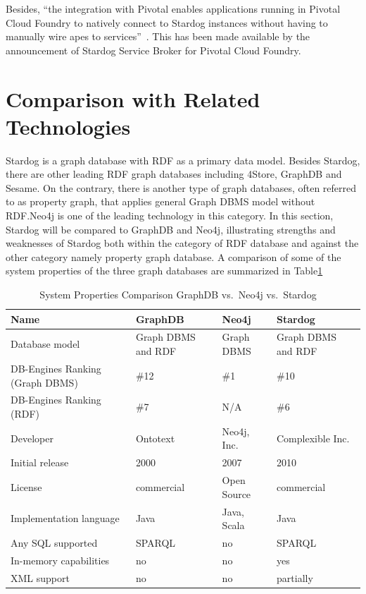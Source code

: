 		Besides, ``the integration with Pivotal enables applications running in 
		Pivotal Cloud Foundry to natively connect to Stardog instances without 
		having to manually wire apes to 
		services''~\cite{hid-sp18-405-blog-stardog-pcf}. This has been made 
		available by the announcement of Stardog Service Broker for Pivotal 
		Cloud Foundry.

\section{Comparison with Related Technologies}
\label{s:comp}
	Stardog is a graph database with RDF as a primary data model. Besides 
	Stardog, there are other leading RDF graph databases including 4Store, 
	GraphDB and Sesame. On the contrary, there is another type of graph 
	databases, often referred to as property graph, that applies general Graph 
	DBMS model without RDF.\@ Neo4j is one of the leading technology in this 
	category. In this section, Stardog will be compared to GraphDB and Neo4j, 
	illustrating strengths and weaknesses of Stardog both within the category 
	of RDF database and against the other category namely property graph 
	database. A comparison of some of the system properties of the three 
	graph databases are summarized in 
	Table\ref{t:comparison}

	\begin{table}[htb]
		\centering
		\caption{System Properties Comparison GraphDB vs.\ Neo4j vs.\ 
		Stardog~\cite{hid-sp18-405-www-stardog-dbengines-neo4j}~\cite{hid-sp18-405-www-stardog-dbengines-graphdb}}\label{t:comparison}
		\begin{tabular}{llll}
		Name & GraphDB & Neo4j & Stardog \\
		\toprule
		Database model&	Graph DBMS and RDF & Graph DBMS & Graph DBMS 
		and RDF \\
		\midrule
		DB-Engines Ranking (Graph DBMS) &\#12 &\#1 &\#10\\
		\midrule
		DB-Engines Ranking (RDF) &\#7 &N/A &\#6\\
		\midrule
		Developer & Ontotext &	Neo4j, Inc.	& Complexible Inc.\\
		\midrule
		Initial release	&2000 &	2007&	2010\\
		\midrule
		License &	commercial &	Open Source &	commercial \\
		\midrule
		Implementation language &	Java &	Java, Scala &	Java\\
		\midrule
		Any SQL supported &	SPARQL &	no	& SPARQL \\
		\midrule
		In-memory capabilities&no &no &			yes\\
		\midrule
		XML support&	no	& no& 	partially\\
		\bottomrule
		\end{tabular}
	\end{table}


